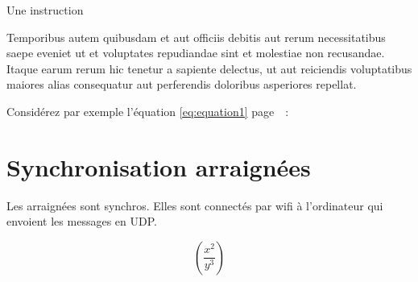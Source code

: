 \begin{algorithm}[H]	
	Une instruction \\
	
\end{algorithm}


Temporibus autem quibusdam et aut officiis debitis aut rerum necessitatibus saepe eveniet ut et voluptates repudiandae sint et molestiae non recusandae. Itaque earum rerum hic tenetur a sapiente delectus, ut aut reiciendis voluptatibus maiores alias consequatur aut perferendis doloribus asperiores repellat.
			

Considérez par exemple l'équation \ref{eq:equation1} page~\pageref{eq:equation1}~:

		\section{Synchronisation arraignées}

Les arraignées sont synchros. Elles sont connectés par wifi à l'ordinateur qui envoient les messages en UDP.

\begin{equation}
\left(\frac{x^2}{y^3}\right)
\label{eq:equation1}
\end{equation}

\clearemptydoublepage

